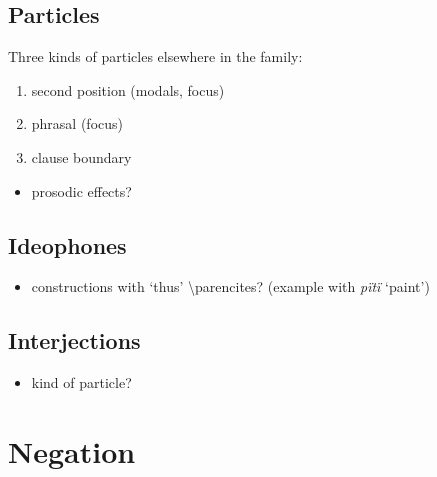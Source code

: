 \documentclass{memoir}
\begin{document}
\section{Particles}

Three kinds of particles elsewhere in the family:

\begin{enumerate}
\def\labelenumi{\arabic{enumi}.}
\tightlist
\item
  second position (modals, focus)
\item
  phrasal (focus)
\item
  clause boundary
\end{enumerate}

\begin{itemize}
\tightlist
\item
  prosodic effects?
\end{itemize}

\section{Ideophones}

\begin{itemize}
\tightlist
\item
  constructions with  `thus' \textbackslash parencites?
  (example with \emph{pïtï} `paint')
\end{itemize}

\section{Interjections}

\begin{itemize}
\tightlist
\item
  kind of particle?
\end{itemize}

\chapter{\texorpdfstring{Negation \label{negation}}{Negation }}
\end{document}
